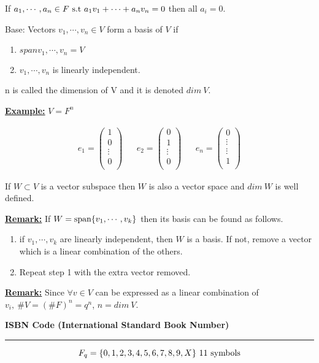 \documentclass{article}
\newcommand{\header}[1]{
	\begin{Large}
	\noindent\textbf{#1}
	\vspace{2pt}
	\hrule
	\vspace{16pt}
	\end{Large}
	\normalsize
}
\renewcommand{\b}[1]{\textbf{#1}}
\newcommand{\ul}[1]{\underline{#1}}
\renewcommand{\aligned}[1]{
	\begin{align*}
		#1
	\end{align*}
}
\newcommand{\newdef}[2]{\b{\ul{#1:}} #2}
\newcommand{\st}{\textnormal{ s.t }}
\begin{document}
If $a_1, \cdots, a_n \in F \st a_1v_1 + \cdots + a_nv_n = 0$ then all
$a_i = 0$.

Base: Vectors $v_1, \cdots, v_n \in V$ form a basis of $V$ if
\begin{enumerate}
	\item $span{v_1, \cdots, v_n} = V$
	\item $v_1, \cdots, v_n$ is linearly independent.
\end{enumerate}
n is called the dimension of V and it is denoted $dim\ V$.

\newdef{Example}{
	$V = F^n$
	\aligned{
		e_1 = \begin{pmatrix}
			1      \\
			0      \\
			\vdots \\
			0      \\
		\end{pmatrix} &  & e_2 = \begin{pmatrix}
			0      \\
			1      \\
			\vdots \\
			0      \\
		\end{pmatrix} &  & e_n = \begin{pmatrix}
			0      \\
			\vdots \\
			\vdots \\
			1      \\
		\end{pmatrix}
	}
	If $W \subset V$ is a vector subspace then $W$ is also a vector space
	and $dim\ W$ is well defined.
}

\newdef{Remark}{
	If $W = \textnormal{span}\{v_1, \cdots, v_k\}$ then its basis can be
	found as follows.
	\begin{enumerate}
		\item if $v_1, \cdots, v_k$ are linearly independent, then $W$
		      is a basis. If not, remove a vector which is a linear
		      combination of the others.
		\item Repeat step 1 with the extra vector removed.
	\end{enumerate}
}

\newdef{Remark}{
	Since $\forall v \in V$ can be expressed as a linear combination of
	$v_i,\ \#V = (\#F)^n = q^n$, $n = dim\ V$.
}

\header{ISBN Code (International Standard Book Number)}

\[
	F_q = \{0, 1, 2, 3, 4, 5, 6, 7, 8, 9, X\}\ \textnormal{11 symbols}
\]
\end{document}
